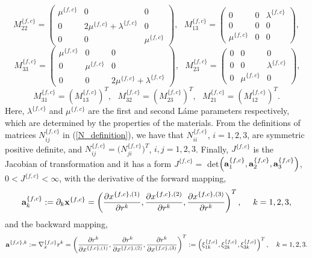 \begin{equation}\label{M_definition}
M_{22}^{\{f,c\}} = \left(\begin{array}{ccc}
\mu^{\{f,c\}} & 0 & 0\\
0 & 2\mu^{\{f,c\}}+\lambda^{\{f,c\}} & 0\\
0 & 0 & \mu^{\{f,c\}}\end{array}\right),\ \ \ M_{13}^{\{f,c\}} = \left(\begin{array}{ccc}
0 & 0 & \lambda^{\{f,c\}}\\
0 & 0 & 0\\
\mu^{\{f,c\}} & 0 & 0\end{array}\right),
\end{equation}
\[\ M_{33}^{\{f,c\}} = \left(\begin{array}{ccc}
\mu^{\{f,c\}} & 0 & 0\\
0 & \mu^{\{f,c\}} & 0\\
0 & 0 & 2\mu^{\{f,c\}}+\lambda^{\{f,c\}}\end{array}\right),\ \ \ M_{23}^{\{f,c\}} = \left(\begin{array}{ccc}
0 & 0 & 0\\
0 & 0 & \lambda^{\{f,c\}}\\
0 & \mu^{\{f,c\}} & 0\end{array}\right),\]
\[ M_{31}^{\{f,c\}} = (M_{13}^{\{f,c\}})^T, \ \ \  M_{32}^{\{f,c\}} =(M_{23}^{\{f,c\}})^T, \ \ \ M_{21}^{\{f,c\}} =(M_{12}^{\{f,c\}})^T.\]
Here, $\lambda^{\{f,c\}}$ and $\mu^{\{f,c\}}$ are the first and second L{\' {a}}me parameters respectively, which are determined by the properties of the materials. From the definitions of matrices $N_{ij}^{\{f,c\}}$ in (\ref{N_definition}), we have that $N_{ii}^{\{f,c\}}$, $i = 1,2,3$, are symmetric positive definite, and $N_{ij}^{\{f,c\}}=\big(N_{ji}^{\{f,c\}}\big)^T$, $i,j=1,2,3$. Finally, $J^{\{f,c\}}$ is the Jacobian of transformation  and it has a form $J^{\{f,c\}} =$ det$\left({\bf a}^{\{f,c\}}_1,{\bf a}^{\{f,c\}}_2,{\bf a}^{\{f,c\}}_3\right)$, $0<J^{\{f,c\}}<\infty$, with the derivative of the forward mapping, 
\begin{equation}\label{forward_map}
{\bf a}_k^{\{f,c\}} := \partial_k{\bf x}^{\{f,c\}}  = \left(\frac{\partial x^{\{f,c\},(1)}}{\partial r^{k}},\frac{\partial x^{\{f,c\},(2)}}{\partial r^{k}},\frac{\partial x^{\{f,c\},(3)}}{\partial r^{k}}\right)^T,\ \ \ \ k = 1,2,3,
\end{equation}
and the backward mapping,
\begin{equation}\label{backward_map}
{\bf a}^{\{f,c\},k} := \nabla_x^{\{f,c\}} r^{k} = \left(\frac{\partial r^{k}}{\partial x^{\{f,c\},(1)}},\frac{\partial r^{k}}{\partial x^{\{f,c\},(2)}},\frac{\partial r^{k}}{\partial x^{\{f,c\},(3)}}\right)^T := \left(\xi_{1k}^{\{f,c\}},\xi_{2k}^{\{f,c\}},\xi_{3k}^{\{f,c\}}\right)^T,\ \ \ k = 1,2,3.
\end{equation}
